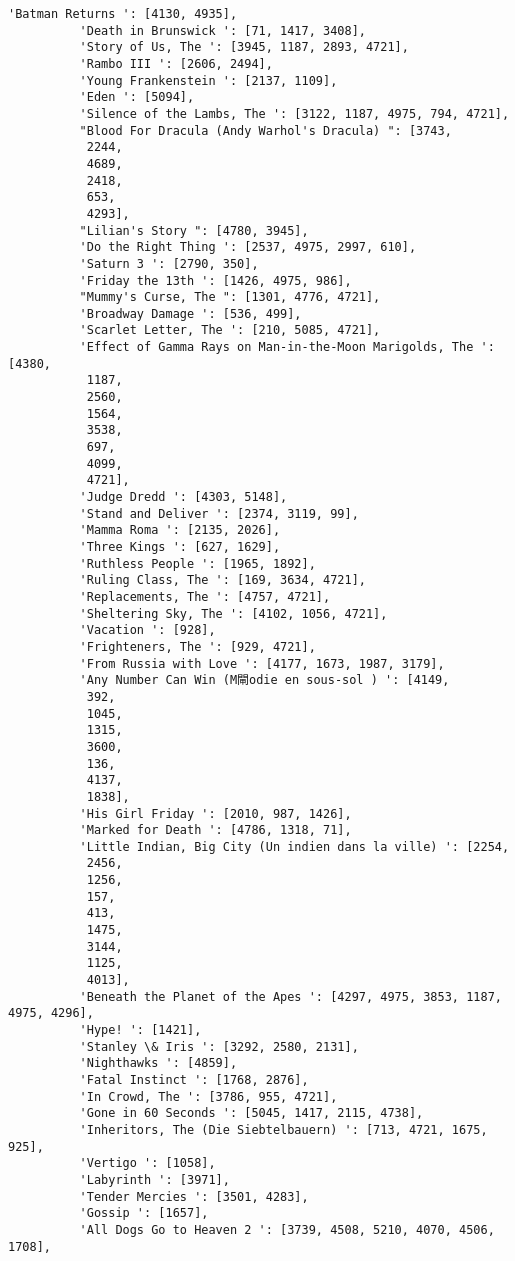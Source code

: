 \documentclass[11pt]{article}
\begin{document}
\begin{Verbatim}[commandchars=\\\{\}]
          'Batman Returns ': [4130, 4935],
          'Death in Brunswick ': [71, 1417, 3408],
          'Story of Us, The ': [3945, 1187, 2893, 4721],
          'Rambo III ': [2606, 2494],
          'Young Frankenstein ': [2137, 1109],
          'Eden ': [5094],
          'Silence of the Lambs, The ': [3122, 1187, 4975, 794, 4721],
          "Blood For Dracula (Andy Warhol's Dracula) ": [3743,
           2244,
           4689,
           2418,
           653,
           4293],
          "Lilian's Story ": [4780, 3945],
          'Do the Right Thing ': [2537, 4975, 2997, 610],
          'Saturn 3 ': [2790, 350],
          'Friday the 13th ': [1426, 4975, 986],
          "Mummy's Curse, The ": [1301, 4776, 4721],
          'Broadway Damage ': [536, 499],
          'Scarlet Letter, The ': [210, 5085, 4721],
          'Effect of Gamma Rays on Man-in-the-Moon Marigolds, The ': [4380,
           1187,
           2560,
           1564,
           3538,
           697,
           4099,
           4721],
          'Judge Dredd ': [4303, 5148],
          'Stand and Deliver ': [2374, 3119, 99],
          'Mamma Roma ': [2135, 2026],
          'Three Kings ': [627, 1629],
          'Ruthless People ': [1965, 1892],
          'Ruling Class, The ': [169, 3634, 4721],
          'Replacements, The ': [4757, 4721],
          'Sheltering Sky, The ': [4102, 1056, 4721],
          'Vacation ': [928],
          'Frighteners, The ': [929, 4721],
          'From Russia with Love ': [4177, 1673, 1987, 3179],
          'Any Number Can Win (M閘odie en sous-sol ) ': [4149,
           392,
           1045,
           1315,
           3600,
           136,
           4137,
           1838],
          'His Girl Friday ': [2010, 987, 1426],
          'Marked for Death ': [4786, 1318, 71],
          'Little Indian, Big City (Un indien dans la ville) ': [2254,
           2456,
           1256,
           157,
           413,
           1475,
           3144,
           1125,
           4013],
          'Beneath the Planet of the Apes ': [4297, 4975, 3853, 1187, 4975, 4296],
          'Hype! ': [1421],
          'Stanley \& Iris ': [3292, 2580, 2131],
          'Nighthawks ': [4859],
          'Fatal Instinct ': [1768, 2876],
          'In Crowd, The ': [3786, 955, 4721],
          'Gone in 60 Seconds ': [5045, 1417, 2115, 4738],
          'Inheritors, The (Die Siebtelbauern) ': [713, 4721, 1675, 925],
          'Vertigo ': [1058],
          'Labyrinth ': [3971],
          'Tender Mercies ': [3501, 4283],
          'Gossip ': [1657],
          'All Dogs Go to Heaven 2 ': [3739, 4508, 5210, 4070, 4506, 1708],

\end{Verbatim}
\end{document}
